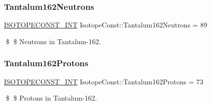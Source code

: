\subsubsection{\texorpdfstring{Tantalum162\+Neutrons}{Tantalum162Neutrons}}
{\footnotesize\ttfamily \mbox{\hyperlink{group___isotope_const-_macros_ga5f18360b3e99483a35c32d789e62621c}{I\+S\+O\+T\+O\+P\+E\+C\+O\+N\+S\+T\+\_\+\+I\+NT}} Isotope\+Const\+::\+Tantalum162\+Neutrons = 89}

\$ \$ Neutrons in Tantalum-\/162. \mbox{\label{group___isotope_const-_tantalum-_ta162_ga141d30600fb9088adb6e8561875a5c8d}} 
\subsubsection{\texorpdfstring{Tantalum162\+Protons}{Tantalum162Protons}}
{\footnotesize\ttfamily \mbox{\hyperlink{group___isotope_const-_macros_ga5f18360b3e99483a35c32d789e62621c}{I\+S\+O\+T\+O\+P\+E\+C\+O\+N\+S\+T\+\_\+\+I\+NT}} Isotope\+Const\+::\+Tantalum162\+Protons = 73}

\$ \$ Protons in Tantalum-\/162. 